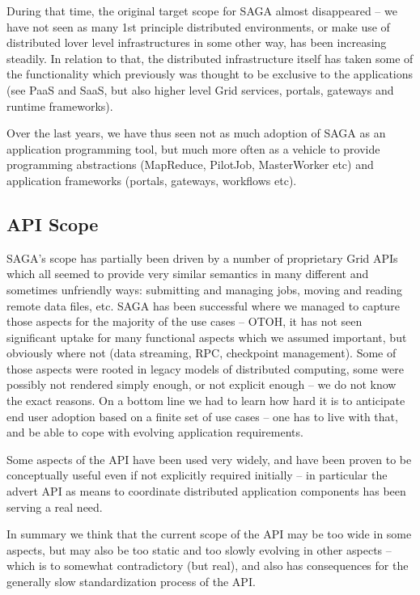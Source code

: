 \documentclass{article}
\begin{document}
  During that time, the original target scope for SAGA almost
  disappeared -- we have not seen as many 1st principle distributed
  environments, or make use of distributed lover level infrastructures
  in some other way, has been increasing steadily.  In relation to
  that, the distributed infrastructure itself has taken some of the
  functionality which previously was thought to be exclusive to the
  applications (see PaaS and SaaS, but also higher level Grid
  services, portals, gateways and runtime frameworks).

  Over the last years, we have thus seen not as much adoption of SAGA
  as an application programming tool, but much more often as a vehicle
  to provide programming abstractions (MapReduce, PilotJob,
  MasterWorker etc) and application frameworks (portals, gateways,
  workflows etc).


 \subsection{API Scope}

  SAGA's scope has partially been driven by a number of proprietary
  Grid APIs which all seemed to provide very similar semantics in many
  different and sometimes unfriendly ways: submitting and managing
  jobs, moving and reading remote data files, etc.  SAGA has been
  successful where we managed to capture those aspects for the
  majority of the use cases -- OTOH, it has not seen significant
  uptake for many functional aspects which we assumed important, but
  obviously where not (data streaming, RPC, checkpoint management).
  Some of those aspects were rooted in legacy models of distributed
  computing, some were possibly not rendered simply enough, or not
  explicit enough -- we do not know the exact reasons.  On a bottom
  line we had to learn how hard it is to anticipate end user adoption
  based on a finite set of use cases -- one has to live with that, and
  be able to cope with evolving application requirements.

  Some aspects of the API have been used very widely, and have been
  proven to be conceptually useful even if not explicitly required
  initially -- in particular the advert API as means to coordinate
  distributed application components has been serving a real need.

  In summary we think that the current scope of the API may be too
  wide in some aspects, but may also be too static and too slowly
  evolving in other aspects -- which is to somewhat contradictory (but
  real), and also has consequences for the generally slow
  standardization process of the API.
\end{document}
